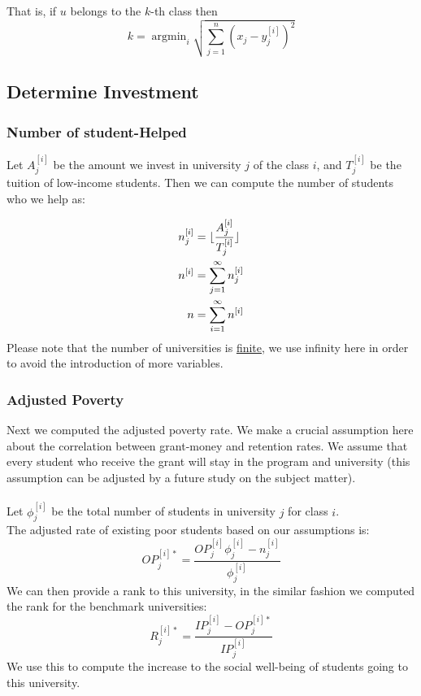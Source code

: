 \documentclass[12pt]{scrartcl}
\DeclarePairedDelimiter\floor{\lfloor}{\rfloor}
\newcommand{\argmin}{\mathop{\mathrm{argmin}}}
\begin{document}
	That is, if $u$ belongs to the $k$-th class then
	$$
		k = \argmin_{i} \sqrt{ \sum_{j=1}^n (x_j-y_j^{[i]})^2 }
	$$
	
	\subsection{Determine Investment}

	\subsubsection{Number of student-Helped}
		Let $A_j^{[i]}$ be the amount we invest in university $j$ of the class $i$, and $T_j^{[i]}$ be the tuition of low-income students. Then we can compute the number of students who we help as:

		\begin{align*}
			n_j^{[i]} &= \floor{\frac{A_j^{[i]}}{T_j^{[i]}}}\\
			n^{[i]} &= \sum_{j=1}^\infty n_j^{[i]}\\
			n &= \sum_{i=1}^\infty n^{[i]}
		\end{align*}
		Please note that the number of universities is \underline{finite}, we use infinity here in order to avoid the introduction of more variables.\\

	\subsubsection{Adjusted Poverty}
		Next we computed the adjusted poverty rate. We make a crucial assumption here about the correlation between grant-money and retention rates. We assume that every student who receive the grant will stay in the program and university (this assumption can be adjusted by a future study on the subject matter).\\
		\\
		Let $\phi_j^{[i]}$ be the total number of students in university $j$ for class $i$.\\
		The adjusted rate of existing poor students based on our assumptions is:
		$$
			OP_j^{[i]*} = \frac{  OP_j^{[i]}\phi_j^{[i]}-n_j^{[i]}  }{ \phi_j^{[i]}  }
		$$
		We can then provide a rank to this university, in the similar fashion we computed the rank for the benchmark universities:
		$$
			R_j^{[i]*}=\frac{IP_j^{[i]}-OP_j^{[i]*}}{IP_j^{[i]}}
		$$
		We use this to compute the increase to the social well-being of students going to this university. 
\end{document}
